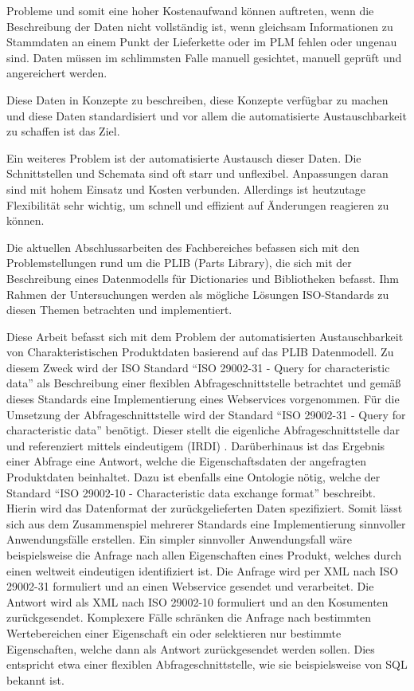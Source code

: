 Probleme und somit eine hoher Kostenaufwand können auftreten, wenn die Beschreibung der Daten nicht vollständig ist, wenn gleichsam Informationen zu Stammdaten an einem Punkt der Lieferkette oder im \gls{PLM} fehlen oder ungenau sind. Daten müssen im schlimmsten Falle manuell gesichtet, manuell geprüft und angereichert werden.  

Diese Daten in Konzepte zu beschreiben, diese Konzepte verfügbar zu machen und diese Daten standardisiert und vor allem die automatisierte Austauschbarkeit zu schaffen ist das Ziel. 

Ein weiteres Problem ist der automatisierte Austausch dieser Daten. Die Schnittstellen und Schemata sind oft starr und unflexibel. Anpassungen daran sind mit hohem Einsatz und Kosten verbunden. Allerdings ist heutzutage Flexibilität sehr wichtig, um schnell und effizient auf Änderungen reagieren zu können. 

Die aktuellen Abschlussarbeiten des Fachbereiches befassen sich mit den Problemstellungen rund um die \gls{PLIB} (Parts Library), die sich mit der Beschreibung eines Datenmodells für Dictionaries und Bibliotheken befasst. Ihm Rahmen der Untersuchungen werden als mögliche Lösungen ISO-Standards zu diesen Themen betrachten und implementiert. 

Diese Arbeit befasst sich mit dem Problem der automatisierten Austauschbarkeit von Charakteristischen Produktdaten basierend auf das PLIB Datenmodell. Zu diesem Zweck wird der ISO Standard \enquote{ISO 29002-31 - Query for characteristic data} als Beschreibung einer flexiblen \gls{Abfrageschnittstelle} betrachtet und gemäß dieses Standards eine Implementierung eines \glspl{Webservice} vorgenommen. 
Für die Umsetzung der \gls{Abfrageschnittstelle} wird der Standard \enquote{ISO 29002-31 - Query for characteristic data} benötigt. Dieser stellt die eigenliche \gls{Abfrageschnittstelle} dar und referenziert mittels eindeutigem  (IRDI) . Darüberhinaus ist das Ergebnis einer Abfrage eine Antwort, welche die Eigenschaftsdaten der angefragten Produktdaten beinhaltet. Dazu ist ebenfalls eine Ontologie nötig, welche der Standard \enquote{ISO 29002-10 - Characteristic data exchange format} beschreibt. Hierin wird das Datenformat der zurückgelieferten Daten spezifiziert. Somit lässt sich aus dem Zusammenspiel mehrerer Standards eine Implementierung sinnvoller Anwendungsfälle erstellen. 
Ein simpler sinnvoller Anwendungsfall wäre beispielsweise die Anfrage nach allen Eigenschaften eines Produkt, welches durch einen weltweit eindeutigen  identifiziert ist. Die Anfrage wird per XML nach ISO 29002-31 formuliert und an einen \gls{Webservice} gesendet und verarbeitet. Die Antwort wird als XML nach ISO 29002-10 formuliert und an den Kosumenten zurückgesendet. Komplexere Fälle schränken die Anfrage nach bestimmten Wertebereichen einer Eigenschaft ein oder selektieren nur bestimmte Eigenschaften, welche dann als Antwort zurückgesendet werden sollen. Dies entspricht etwa einer flexiblen \gls{Abfrageschnittstelle}, wie sie beispielsweise von SQL bekannt ist.  

